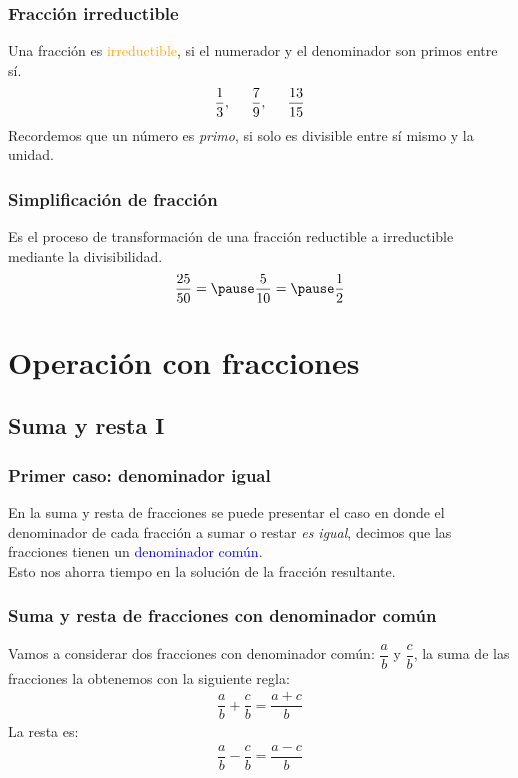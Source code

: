 \begin{frame}
\frametitle{Fracción irreductible}
Una fracción es \textcolor{orange}{irreductible}, si el numerador y el denominador son primos entre sí.
\begin{align*}
\dfrac{1}{3}, \hspace{0.5cm} \dfrac{7}{9}, \hspace{0.5cm} \dfrac{13}{15}
\end{align*}
\pause
Recordemos que un número es \emph{primo}, si solo es divisible entre sí mismo y la unidad.
\end{frame}
\begin{frame}
\frametitle{Simplificación de fracción}
Es el proceso de transformación de una fracción reductible a irreductible mediante la divisibilidad.
\begin{eqnarray*}
\dfrac{25}{50} = \pause \dfrac{5}{10} = \pause \dfrac{1}{2}
\end{eqnarray*}
\end{frame}

\section{Operación con fracciones}
\subsection{Suma y resta I}

\begin{frame}
\frametitle{Primer caso: denominador igual}
En la suma y resta de fracciones se puede presentar el caso en donde el denominador de cada fracción a sumar o restar \emph{es igual}, decimos que las fracciones tienen un \textcolor{blue}{denominador común}.
\\
\bigskip
\pause
Esto nos ahorra tiempo en la solución de la fracción resultante.
\end{frame}
\begin{frame}
\frametitle{Suma y resta de fracciones con denominador común}
Vamos a considerar dos fracciones con denominador común: $\dfrac{a}{b}$ y $\dfrac{c}{b}$, la suma de las fracciones la obtenemos con la siguiente regla:
\pause
\begin{align*}
\dfrac{a}{b} + \dfrac{c}{b} = \dfrac{a + c}{b}
\end{align*}
La resta es:
\begin{align*}
\dfrac{a}{b} - \dfrac{c}{b} = \dfrac{a - c}{b}
\end{align*}
\end{frame}


